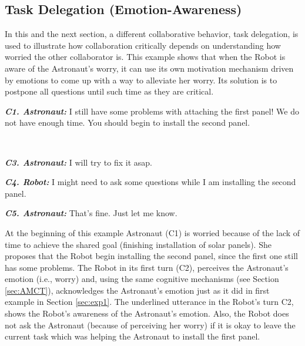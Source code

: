 \subsection{Task Delegation (Emotion-Awareness)}
\label{sec:exp3}

In this and the next section, a different collaborative behavior, task
delegation, is used to illustrate how collaboration critically depends on
understanding how worried the other collaborator is. This example shows that
when the Robot is aware of the Astronaut's worry, it can use its own motivation
mechanism driven by emotions to come up with a way to alleviate her worry. Its
solution is to postpone all questions until such time as they are
critical. 

\begin{description}
  \item \textit{\textbf{C1. Astronaut:}} I still have some problems with
  attaching the first panel! We do not have enough time. You should begin to
  install the second panel.\\

  \item {}\\

  \item \textit{\textbf{C3. Astronaut:}} I will try to fix it asap.\\

  \item \textit{\textbf{C4. Robot:}} I might need to ask some questions while I
  am installing the second panel.\\

  \item \textit{\textbf{C5. Astronaut:}} That's fine. Just let me know.
  
\end{description}

At the beginning of this example Astronaut (C1) is worried because of the lack
of time to achieve the shared goal (finishing installation of solar panels). She
proposes that the Robot begin installing the second panel, since the first one
still has some problems. The Robot in its first turn (C2), perceives the
Astronaut's emotion (i.e., worry) and, using the same cognitive mechanisms (see
Section \ref{sec:AMCT}), acknowledges the Astronaut's emotion just as it did in
first example in Section \ref{sec:exp1}. The underlined utterance in the Robot's
turn C2, shows the Robot's awareness of the Astronaut's emotion. Also, the Robot
does not ask the Astronaut (because of perceiving her worry) if it is okay to
leave the current task which was helping the Astronaut to install the first
panel.

